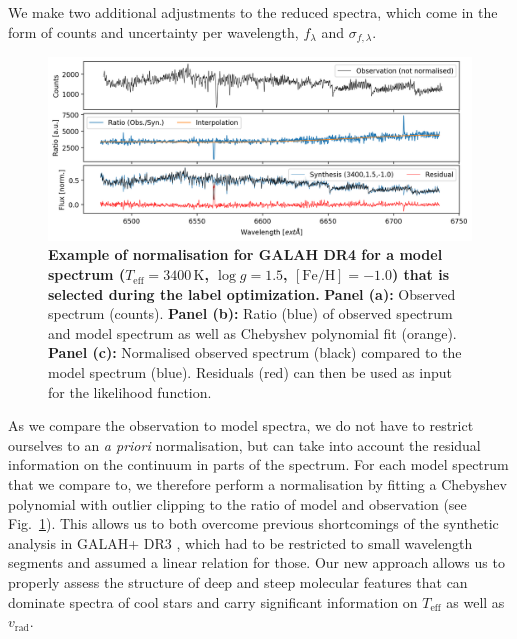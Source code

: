 \documentclass[
  journal=pasa,
  manuscript=research-paper, %
  year=2024,
  volume=37
]{cup-journal}
\newcommand{\SB}[1]{{\textcolor{purple}{#1}}}
\newcommand{\Teff}{$T_\mathrm{eff}$\xspace}
\newcommand{\logg}{$\log g$\xspace}
\newcommand{\feh}{$\mathrm{[Fe/H]}$\xspace}
\newcommand{\vrad}{$v_\mathrm{rad}$\xspace}
\newcommand{\TheCannon}{\textit{The Cannon}\xspace}
\newcommand{\dex}{\,\mathrm{dex}}	%
\newcommand{\K}{\,\mathrm{K}}	%
\begin{document}
We make two additional adjustments to the reduced spectra, which come in the form of counts and uncertainty per wavelength, $f_\lambda$ and $\sigma_{f,\lambda}$.

\begin{figure}[ht]
\centering
\includegraphics[width=\textwidth]{figures/Nuisance_example.png}
\caption{
\textbf{Example of normalisation for GALAH DR4 for a model spectrum ($T_\mathrm{eff} = 3400\,\mathrm{K}$, $\log g = 1.5$, $\mathrm{[Fe/H] = -1.0}$) that is selected during the label optimization.}
\textbf{Panel (a):} Observed spectrum (counts).
\textbf{Panel (b):} Ratio (blue) of observed spectrum and model spectrum as well as Chebyshev polynomial fit (orange).
\textbf{Panel (c):} Normalised observed spectrum (black) compared to the model spectrum (blue). Residuals (red) can then be used as input for the likelihood function.
}
\label{fig:ratio_normalisation}
\end{figure}

As we compare the observation to model spectra, we do not have to restrict ourselves to an \textit{a priori} normalisation, but can take into account the residual information on the continuum in parts of the spectrum. For each model spectrum that we compare to, we therefore perform a normalisation by fitting a Chebyshev polynomial with outlier clipping to the ratio of model and observation (see Fig.~\ref{fig:ratio_normalisation}). This allows us to both overcome previous shortcomings of the synthetic analysis in GALAH+ DR3 \citep{Buder2021}, which had to be restricted to small wavelength segments and assumed a linear relation for those. Our new approach allows us to properly assess the structure of deep and steep molecular features that can dominate spectra of cool stars and carry significant information on \Teff as well as \vrad.

\end{document}
